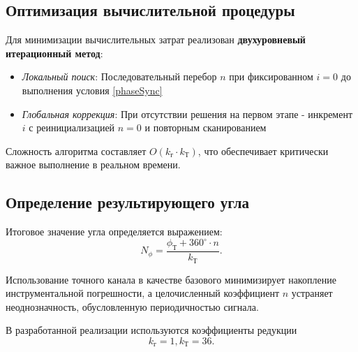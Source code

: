 \subsection{Оптимизация вычислительной процедуры}
Для минимизации вычислительных затрат реализован \textbf{двухуровневый итерационный метод}:
\begin{itemize}
    \item \textit{Локальный поиск}: Последовательный перебор $n$ при фиксированном $i=0$ до выполнения условия \ref{phaseSync} 
    \item \textit{Глобальная коррекция}: При отсутствии решения на первом этапе - инкремент $i$ с реинициализацией $n=0$ и повторным сканированием
\end{itemize}
Сложность алгоритма составляет $O(k_{\text{г}} \cdot k_{\text{Т}})$, что обеспечивает критически важное выполнение в реальном времени.

\subsection{Определение результирующего угла}
Итоговое значение угла определяется выражением:
\begin{equation}
    N_{\phi} = \frac{\phi_{\text{Т}} + 360^{\circ} \cdot n}{k_{\text{Т}}}.
\end{equation}


 Использование точного канала в качестве базового минимизирует накопление инструментальной погрешности, 
а целочисленный коэффициент $n$ устраняет неоднозначность, обусловленную периодичностью сигнала.

В разработанной реализации используются коэффициенты редукции 
\begin{equation} k_{\text{г}} = 1, k_{\text{Т}} = 36. \end{equation}

